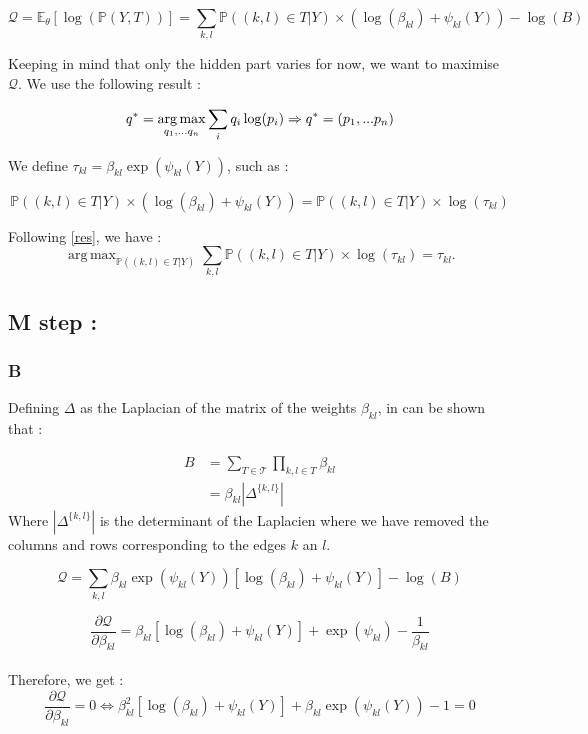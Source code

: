 \documentclass[a4paper,10pt]{article}
\DeclareMathOperator*{\argmax}{arg\,max}
\begin{document}
\[ \mathcal{Q} = \mathds{E}_\theta[\log(\mathds{P}(Y,T))] = \sum_{k,l}  \mathds{P}((k,l)\in T | Y) \times \left( \log(\beta_{kl}) + \psi_{kl}(Y) \right)
 -\log(B)\]
 
Keeping in mind that only the hidden part varies for now, we want to maximise $\mathcal{Q}$. We use the following result :

\begin{equation}
 \label{res}
q^ * =  \argmax_{q_1,...q_n}  \sum_i q_i \log(p_i) \Rightarrow q^ * = (p_1,...p_n) \\
\end{equation}

We define $\tau_{kl} = \beta_{kl}\exp(\psi_{kl}(Y))$, such as :

\[\mathds{P}((k,l)\in T | Y) \times( \log(\beta_{kl}) + \psi_{kl}(Y)) = 
\mathds{P}((k,l)\in T | Y) \times \log(\tau_{kl}) \]

Following \ref{res}, we have :
\[\argmax_{\mathds{P}((k,l)\in T | Y)}  \sum_{k,l}  \mathds{P}((k,l)\in T | Y)\times \log(\tau_{kl}) =  \tau_{kl}.\]
\subsection{M step :\\}


\subsubsection{B}
Defining $\Delta$ as the Laplacian of the matrix of the weights $\beta_{kl}$, in can be shown that :

\begin{align*}
B &= \sum_{T \in \mathcal{T}} \prod_{k,l\in T} \beta_{kl}\\
 &=\beta_{kl}|\Delta^{\{k,l\}}|
\end{align*}
Where $|\Delta^{\{k,l\}}|$ is the determinant of the Laplacien where we have removed the columns and rows corresponding to
the edges $k$ an $l$.

\[\mathcal{Q} = \sum_{k,l} \beta_{kl} \exp(\psi_{kl}(Y))\left[\log(\beta_{kl}) + \psi_{kl}(Y)\right] - \log(B) \]


\[ \frac{\partial \mathcal{Q}}{\partial \beta_{kl}} = \beta_{kl}\left[\log(\beta_{kl}) + \psi_{kl}(Y)\right] + \exp(\psi_{kl}) -\frac{1}{\beta_{kl}}\]\\

Therefore, we get :
\[ \frac{\partial \mathcal{Q}}{\partial \beta_{kl}}  = 0 \Leftrightarrow \beta_{kl}^2\left[\log(\beta_{kl}) + \psi_{kl}(Y)\right] + \beta_{kl} \exp(\psi_{kl}(Y)) -1 =0\]
\end{document}
